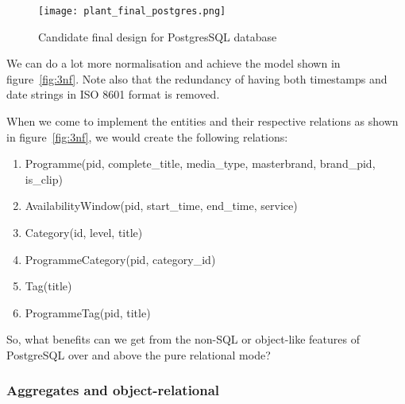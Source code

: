 \documentclass[11pt,a4paper]{article}
\begin{document}
\begin{comment}
  @startuml plant_final_postgres.png
  class Programme {
    pid : varchar
    complete_title : varchar
    media_type : enum ['video, 'audio']
    masterbrand : varchar
    brand_pid : varchar
    is_clip : boolean
    tags : varchar[]
  }
  class AvailabilityWindow {
    start_time : timestamp
    end_time : timestamp
    service : varchar
  }
  class Category {
    id : varchar
    title : varchar
  }
  class Subcategory extends Category {
    parent : Category
  }
  Programme "1" -d- "0..*" AvailabilityWindow
  Programme "0..*" -r- "0..*" Category
  @enduml
\end{comment}
\begin{figure}[p]
  \begin{center}
    \texttt{[image: plant\_final\_postgres.png]}
  \end{center}
  \caption{Candidate final design for PostgresSQL database}
  \label{fig:final_postgres}
\end{figure}

We can do a lot more normalisation and achieve the model shown in
figure~\ref{fig:3nf}. Note also that the redundancy of having both
timestamps and date strings in ISO 8601 format is removed.

When we come to implement the entities and their respective relations
as shown in figure~\ref{fig:3nf}, we would create the following relations:

\begin{enumerate}
  \item Programme(pid, complete\_title, media\_type, masterbrand, brand\_pid, is\_clip)
  \item AvailabilityWindow(pid, start\_time, end\_time, service)
  \item Category(id, level, title)
  \item ProgrammeCategory(pid, category\_id)
  \item Tag(title)
  \item ProgrammeTag(pid, title)
\end{enumerate}

So, what benefits can we get from the non-SQL or object-like features of
PostgreSQL over and above the pure relational mode?

\subsubsection{Aggregates and object-relational}
\end{document}
